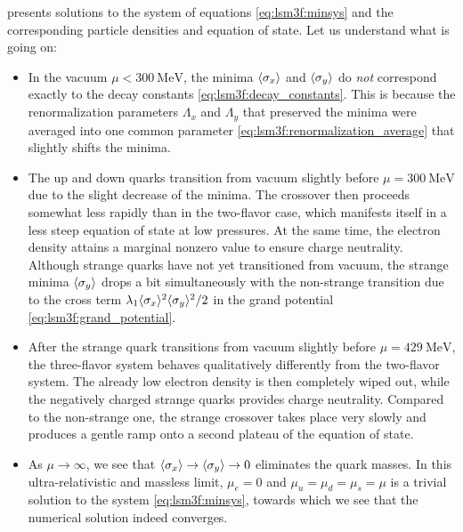  presents solutions to the system of equations \eqref{eq:lsm3f:minsys} and the corresponding particle densities and equation of state.
Let us understand what is going on:
\begin{itemize}
\item In the vacuum $\mu < \SI{300}{\mega\electronvolt}$, the minima $\langle \sigma_x \rangle$ and $\langle \sigma_y \rangle$ do \emph{not} correspond exactly to the decay constants \eqref{eq:lsm3f:decay_constants}.
      This is because the renormalization parameters $\Lambda_x$ and $\Lambda_y$ that preserved the minima were averaged into one common parameter \eqref{eq:lsm3f:renormalization_average} that slightly shifts the minima.
\item The up and down quarks transition from vacuum slightly before $\mu = \SI{300}{\mega\electronvolt}$ due to the slight decrease of the minima.
      The crossover then proceeds somewhat less rapidly than in the two-flavor case, which manifests itself in a less steep equation of state at low pressures.
      At the same time, the electron density attains a marginal nonzero value to ensure charge neutrality.
      Although strange quarks have not yet transitioned from vacuum, the strange minima $\langle \sigma_y \rangle$ drops a bit simultaneously with the non-strange transition due to the cross term $\lambda_1 \langle \sigma_x \rangle^2 \langle \sigma_y \rangle^2 / 2$ in the grand potential \eqref{eq:lsm3f:grand_potential}.
\item After the strange quark transitions from vacuum slightly before $\mu = \SI{429}{\mega\electronvolt}$, the three-flavor system behaves qualitatively differently from the two-flavor system.
      The already low electron density is then completely wiped out, while the negatively charged strange quarks provides charge neutrality.
      Compared to the non-strange one, the strange crossover takes place very slowly and produces a gentle ramp onto a second plateau of the equation of state.
\item As $\mu \rightarrow \infty$, we see that $\langle \sigma_x \rangle \rightarrow \langle \sigma_y \rangle \rightarrow 0$ eliminates the quark masses.
      In this ultra-relativistic and massless limit, $\mu_e = 0$ and $\mu_u = \mu_d = \mu_s = \mu$ is a trivial solution to the system \eqref{eq:lsm3f:minsys},
      towards which we see that the numerical solution indeed converges.
\end{itemize}

